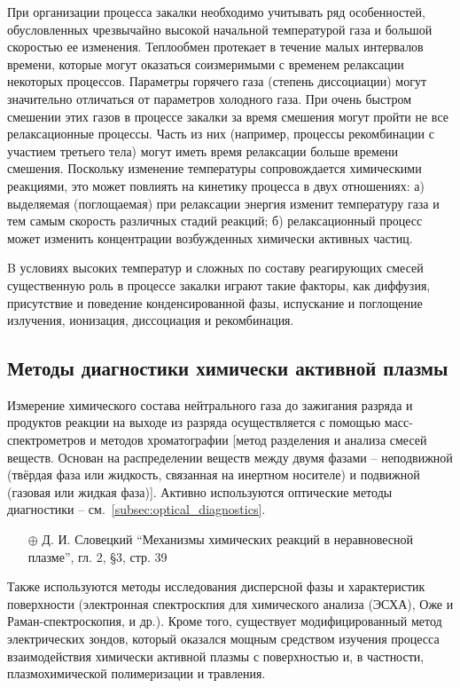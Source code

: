 \documentclass[10pt, a4paper]{article}
\begin{document}
При организации процесса закалки необходимо учитывать ряд особенностей, обусловленных чрезвычайно высокой начальной температурой газа и большой скоростью ее изменения. Теплообмен протекает в течение малых интервалов времени, которые могут оказаться соизмеримыми с временем релаксации некоторых процессов. Параметры горячего газа (степень диссоциации) могут значительно отличаться от параметров холодного газа. При очень быстром смешении этих газов в процессе закалки за время смешения могут пройти не все релаксационные процессы. Часть из них (например, процессы рекомбинации с участием третьего тела) могут иметь время релаксации больше времени смешения. Поскольку изменение температуры сопровождается химическими реакциями, это может повлиять на кинетику процесса в двух отношениях: а) выделяемая (поглощаемая) при релаксации энергия изменит температуру газа и тем самым скорость различных стадий реакций; б) релаксационный процесс может изменить концентрации возбужденных химически активных частиц.

B условиях высоких температур и сложных по составу реагирующих смесей существенную роль в процессе закалки играют такие факторы, как диффузия, присутствие и поведение конденсированной фазы, испускание и поглощение излучения, ионизация, диссоциация и рекомбинация.

\subsection{Методы диагностики химически активной плазмы}

Измерение химического состава нейтрального газа до зажигания разряда и продуктов реакции на выходе из разряда осуществляется с помощью масс-спектрометров и методов хроматографии [метод разделения и анализа смесей веществ. Основан на распределении веществ между двумя фазами -- неподвижной (твёрдая фаза или жидкость, связанная на инертном носителе) и подвижной (газовая или жидкая фаза)]. Активно используются оптические методы диагностики -- см.~\ref{subsec:optical_diagnostics}.

\begin{itemize}
	\item[$\oplus$] Д. И. Словецкий ``Механизмы химических реакций в неравновесной плазме'', гл. 2, \S3, стр. 39
\end{itemize}

Также используются методы исследования дисперсной фазы и характеристик поверхности (электронная спектроскпия для химического анализа (ЭСХА), Оже и Раман-спектроскопия, и др.). Кроме того, существует модифицированный метод электрических зондов, который оказался мощным средством изучения процесса взаимодействия химически активной плазмы с поверхностью и, в частности, плазмохимической полимеризации и травления.
\end{document}
